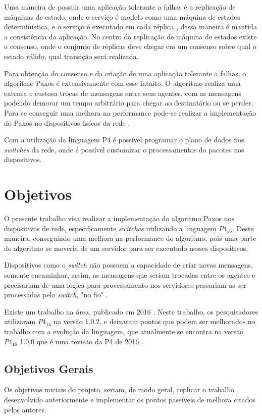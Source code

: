 \documentclass[12pt,
openright, 
oneside,
a4paper,
brazil]{facom-ufu-abntex2}
\begin{document}
Uma maneira de possuir uma aplicação tolerante a falhas é a replicação de máquinas
de estado, onde o serviço é modelo como uma máquina de estados determinística, e o
serviço é executado em cada réplica \citep{santos2012state}, dessa maneira é mantida
a consistência da aplicação. No centro da replicação de máquina de estados existe o 
consenso, onde o conjunto de réplicas deve chegar em um consenso sobre qual o estado 
válido, qual transição será realizada. 

Para obtenção do consenso e da criação de uma aplicação tolerante a falhas, o algoritmo
Paxos é extensivamente com esse intuito. O algoritmo realiza uma extensa e custosa 
trocas de mensagens entre seus agentes, com as mensagens podendo demorar um tempo 
arbitrário para chegar ao destinatário ou se perder. Para se conseguir uma melhora na
performance pode-se realizar a implementação do Paxos no dispositivos fisícos da rede
\citep{dang2016paxos}.

Com a utilização da linguagem P4 é possível programar o plano de dados nos 
\textit{switches} da rede, onde é possível customizar o processamentos do pacotes
nos dispositivos. 


\section{Objetivos}
O presente trabalho visa realizar a implementação do algoritmo Paxos nos dispositivos
de rede, especificamente \textit{switches} utilizando a linguagem $P4_{16}$. 
Deste maneira, conseguindo uma melhora na performance do algoritmo, pois uma parte 
do algoritmo se moveria de um servidor para ser executado nesses dispositivos.

Dispositivos como o \textit{switch} não possuem a capacidade de criar novas mensagens,
somente encaminhar, assim, as mensagens que seriam trocadas entre os agentes e precisariam
de uma lógica para processamento nos servidores passariam as ser processadas pelo 
\textit{switch}, "no fio" \citep{dang2016paxos}.

Existe um trabalho na área, publicado em 2016 \citep{dang2016paxos}. Neste trabalho,
os pesquisadores utilizaram $P4_{14}$ na versão 1.0.2, e deixaram pontos que podem ser
melhorados no trabalho com a evolução da linguagem, que atualmente se encontra na versão
$P4_{16}$ 1.0.0 que é uma revisão da P4 de 2016 \citep{paxos16spec}.

\subsection{Objetivos Gerais}
Os objetivos iniciais do projeto, seriam, de modo geral, replicar o trabalho 
desenvolvido anteriormente e implementar os pontos passíveis de melhora citados
pelos autores.
\end{document}
